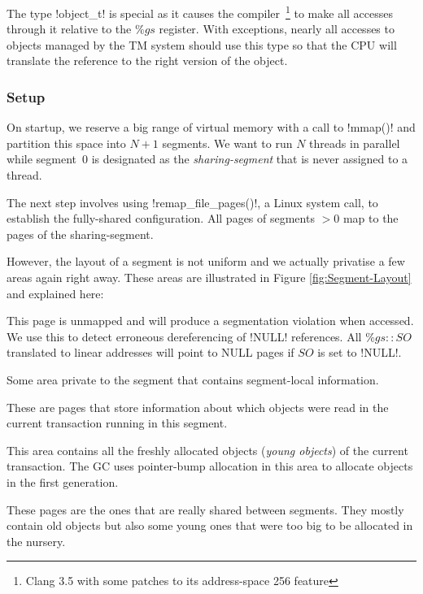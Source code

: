 \documentclass{sigplanconf}
\makeatletter
\renewcommand\lstinline[1][]{%
  \Collectverb{\@@myverb}%
}
\def\@@myverb#1{%
    \begingroup
    \fboxsep=0.2em
    \colorbox{verylightgray}{\oldlstinline|#1|}%
    \endgroup
}
\makeatother
\begin{document}
The type \lstinline!object_t!  is special as it causes the
compiler~\footnote{Clang 3.5 with some patches to its address-space
 256 feature} to make all accesses through it relative to the $\%gs$
register.  With exceptions, nearly all accesses to objects managed by
the TM system should use this type so that the CPU will translate the
reference to the right version of the object.


\subsubsection{Setup\label{sub:Setup}}

On startup, we reserve a big range of virtual memory with a call to
\lstinline!mmap()! and partition this space into $N+1$ segments. We
want to run $N$ threads in parallel while segment~0 is designated as
the \emph{sharing-segment} that is never assigned to a thread.

The next step involves using \lstinline!remap_file_pages()!, a Linux
system call, to establish the fully-shared configuration.  All pages
of segments $>0$ map to the pages of the sharing-segment.

However, the layout of a segment is not uniform and we actually
privatise a few areas again right away. These areas are illustrated in
Figure \ref{fig:Segment-Layout} and explained here:
\begin{description}[noitemsep]
\item [{NULL~page:}] This page is unmapped and will produce a
  segmentation violation when accessed. We use this to detect
  erroneous dereferencing of \lstinline!NULL! references.  All
  $\%gs{::}SO$ translated to linear addresses will point to NULL pages
  if $SO$ is set to \lstinline!NULL!.
\item [{Segment-local~data:}] Some area private to the segment that
  contains segment-local information.
\item [{Read~markers:}] These are pages that store information about
  which objects were read in the current transaction running in this
  segment.
\item [{Nursery:}] This area contains all the freshly allocated
  objects (\emph{young objects}) of the current transaction. The GC
  uses pointer-bump allocation in this area to allocate objects in the
  first generation.
\item [{Old~object~space:}] These pages are the ones that are really
  shared between segments. They mostly contain old objects but also
  some young ones that were too big to be allocated in the nursery.
\end{description}
\end{document}
